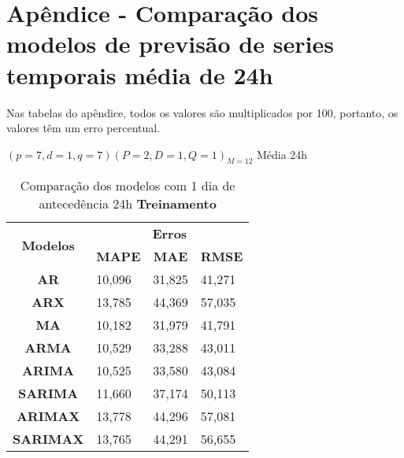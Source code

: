 
\section{Ap\^endice - Compara\c c\~ao dos modelos de previs\~ao de series temporais m\'edia de 24h}\label{sec:comtb24}

Nas tabelas do apêndice, todos os valores são multiplicados por 100, portanto, os valores têm um erro percentual.

$(p = 7,d = 1,q = 7) (P = 2,D = 1,Q = 1)_{M = 12}$ Média 24h
	\begin{table}[H]
	\centering
	\caption{Comparação dos modelos com 1 dia de antecedência 24h \textbf{Treinamento} }\label{tb:1-24trn}
	\begin{tabular}{@{}clll@{}}
		\toprule
		\multirow{2}{*}{\textbf{Modelos}} & \multicolumn{3}{c}{\textbf{Erros}}                                                                       \\ \cmidrule(l){2-4} 
		& \multicolumn{1}{c}{\textbf{MAPE}} & \multicolumn{1}{c}{\textbf{MAE}} & \multicolumn{1}{c}{\textbf{RMSE}} \\ \hline
\textbf{AR}                       & 10,096                            & 31,825                           & 41,271                            \\
\textbf{ARX}                      & 13,785                            & 44,369                           & 57,035                            \\
\textbf{MA}                       & 10,182                            & 31,979                           & 41,791                            \\
\textbf{ARMA}                     & 10,529                            & 33,288                           & 43,011                            \\
\textbf{ARIMA}                    & 10,525                            & 33,580                           & 43,084                            \\
\textbf{SARIMA}                   & 11,660                            & 37,174                           & 50,113                            \\
\textbf{ARIMAX}                   & 13,778                            & 44,296                           & 57,081                            \\
\textbf{SARIMAX}                  & 13,765                            & 44,291                           & 56,655                            \\

\end{tabular}
\end{table}
